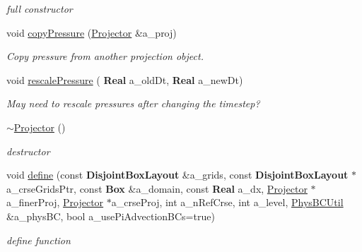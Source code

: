 \begin{DoxyCompactItemize}
\begin{DoxyCompactList}\small\item\em full constructor \end{DoxyCompactList}\item 
\mbox{\label{class_projector_a064aa6bfcee589711f44874c41d32968}} 
void \hyperlink{class_projector_a064aa6bfcee589711f44874c41d32968}{copy\+Pressure} (\hyperlink{class_projector}{Projector} \&a\+\_\+proj)
\begin{DoxyCompactList}\small\item\em Copy pressure from another projection object. \end{DoxyCompactList}\item 
\mbox{\label{class_projector_a63a157fecdf3b981c1d3eca83f04429c}} 
void \hyperlink{class_projector_a63a157fecdf3b981c1d3eca83f04429c}{rescale\+Pressure} (\textbf{ Real} a\+\_\+old\+Dt, \textbf{ Real} a\+\_\+new\+Dt)
\begin{DoxyCompactList}\small\item\em May need to rescale pressures after changing the timestep? \end{DoxyCompactList}\item 
\mbox{\label{class_projector_a24513cbefdcc21dc3dec3ff76f7483b4}} 
\hyperlink{class_projector_a24513cbefdcc21dc3dec3ff76f7483b4}{$\sim$\+Projector} ()
\begin{DoxyCompactList}\small\item\em destructor \end{DoxyCompactList}\item 
\mbox{\label{class_projector_a2f884ed717e774460d0de351a8daf3c8}} 
void \hyperlink{class_projector_a2f884ed717e774460d0de351a8daf3c8}{define} (const \textbf{ Disjoint\+Box\+Layout} \&a\+\_\+grids, const \textbf{ Disjoint\+Box\+Layout} $\ast$a\+\_\+crse\+Grids\+Ptr, const \textbf{ Box} \&a\+\_\+domain, const \textbf{ Real} a\+\_\+dx, \hyperlink{class_projector}{Projector} $\ast$a\+\_\+finer\+Proj, \hyperlink{class_projector}{Projector} $\ast$a\+\_\+crse\+Proj, int a\+\_\+n\+Ref\+Crse, int a\+\_\+level, \hyperlink{class_phys_b_c_util}{Phys\+B\+C\+Util} \&a\+\_\+phys\+BC, bool a\+\_\+use\+Pi\+Advection\+B\+Cs=true)
\begin{DoxyCompactList}\small\item\em define function \end{DoxyCompactList}\item 

\end{DoxyCompactItemize}
